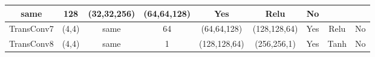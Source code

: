 \documentclass[a4paper,fleqn]{cas-dc}
\begin{document}
\begin{table}[htbp]
\begin{tabular}{|c|c|c|c|c|c|c|c|c|}
  {\color[HTML]{000000} same} &
  {\color[HTML]{000000} 128} &
  {\color[HTML]{000000} (32,32,256)} &
  {\color[HTML]{000000} (64,64,128)} &
  {\color[HTML]{000000} Yes} &
  {\color[HTML]{000000} Relu} &
  {\color[HTML]{000000} No} \\ \hline
{\color[HTML]{000000} TransConv7} &
  {\color[HTML]{000000} (4,4)} &
  {\color[HTML]{000000} same} &
  {\color[HTML]{000000} 64} &
  {\color[HTML]{000000} (64,64,128)} &
  {\color[HTML]{000000} (128,128,64)} &
  {\color[HTML]{000000} Yes} &
  {\color[HTML]{000000} Relu} &
  {\color[HTML]{000000} No} \\ \hline
{\color[HTML]{000000} TransConv8} &
  {\color[HTML]{000000} (4,4)} &
  {\color[HTML]{000000} same} &
  {\color[HTML]{000000} 1} &
  {\color[HTML]{000000} (128,128,64)} &
  {\color[HTML]{000000} (256,256,1)} &
  {\color[HTML]{000000} Yes} &
  {\color[HTML]{000000} Tanh} &
  {\color[HTML]{000000} No} \\ \hline
\end{tabular}
\label{tab1}
\end{table}
\end{document}
